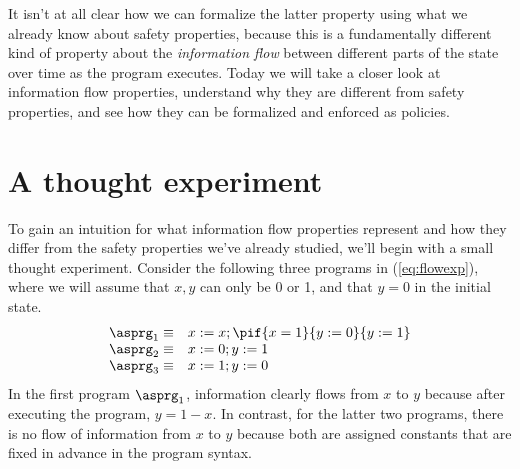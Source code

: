 \documentclass[11pt,twoside]{scrartcl}
\begin{document}
It isn't at all clear how we can formalize the latter property using what we already know about safety properties, because this is a fundamentally different kind of property about the \emph{information flow} between different parts of the state over time as the program executes. Today we will take a closer look at information flow properties, understand why they are different from safety properties, and see how they can be formalized and enforced as policies.

\section{A thought experiment}

To gain an intuition for what information flow properties represent and how they differ from the safety properties we've already studied, we'll begin with a small thought experiment. Consider the following three programs in (\ref{eq:flowexp}), where we will assume that $x,y$ can only be 0 or 1, and that $y = 0$ in the initial state.
\begin{equation}
\label{eq:flowexp}
\begin{array}{ll}
\asprg_1 \equiv & x := x; \pif{x = 1}{y:=0}{y:=1} \\
\asprg_2 \equiv & x := 0; y := 1 \\
\asprg_3 \equiv & x := 1; y := 0 \\
\end{array}
\end{equation}
In the first program $\asprg_1$, information clearly flows from $x$ to $y$ because after executing the program, $y = 1 - x$. In contrast, for the latter two programs, there is no flow of information from $x$ to $y$ because both are assigned constants that are fixed in advance in the program syntax.
\end{document}
